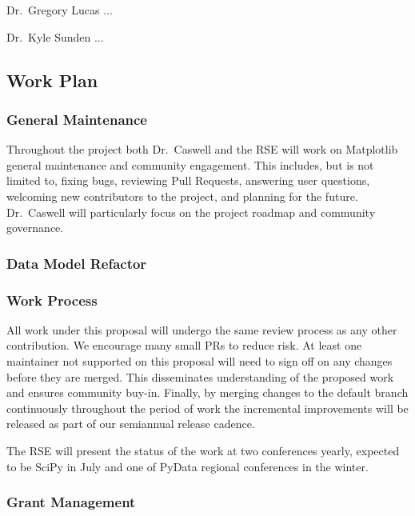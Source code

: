 \documentclass[12pt]{article}
\numberwithin{page}{section}
\begin{document}
Dr.\ Gregory Lucas ...

Dr.\ Kyle Sunden ...


\subsection{Work Plan}


\subsubsection{General Maintenance}

Throughout the project both Dr.\ Caswell and the RSE will work on
Matplotlib general maintenance and community engagement.  This includes,
but is not limited to, fixing bugs, reviewing Pull Requests, answering
user questions, welcoming new contributors to the project, and
planning for the future.  Dr.\ Caswell will particularly focus on
the project roadmap and community governance.


\subsubsection{Data Model Refactor}

\subsubsection{Work Process}

All work under this proposal will undergo the same review process
as any other contribution.  We
encourage many small PRs to reduce risk.  At least one maintainer not
supported on this proposal
will need to sign off on any changes before they are merged. This
disseminates understanding of the proposed work and ensures
community buy-in.  Finally, by merging
changes to the default branch continuously throughout the period of
work the incremental improvements will be released as part of our
semiannual release cadence.

The RSE will present the status of the work at two conferences yearly,
expected to be SciPy in July and one of PyData regional conferences in
the winter.


\subsubsection{Grant Management}
\end{document}
